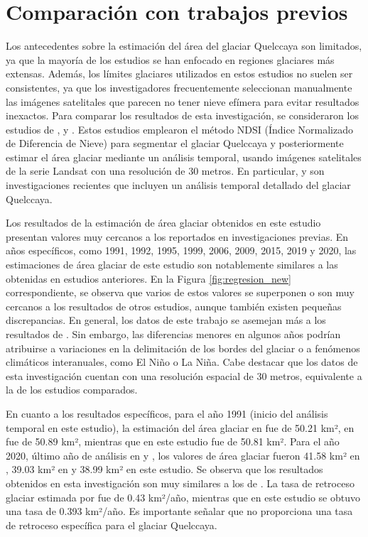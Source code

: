  \chapter{Comparación con trabajos previos}
\doublespacing
Los antecedentes sobre la estimación del área del glaciar Quelccaya son limitados, ya que la mayoría de los estudios se han enfocado en regiones glaciares más extensas. Además, los límites glaciares utilizados en estos estudios no suelen ser consistentes, ya que los investigadores frecuentemente seleccionan manualmente las imágenes satelitales que parecen no tener nieve efímera para evitar resultados inexactos. Para comparar los resultados de esta investigación, se consideraron los estudios de \parencite{malone2022evolution}, \parencite{taylor2022multi} y \parencite{hanshaw2014glacial}. Estos estudios emplearon el método NDSI (Índice Normalizado de Diferencia de Nieve) para segmentar el glaciar Quelccaya y posteriormente estimar el área glaciar mediante un análisis temporal, usando imágenes satelitales de la serie Landsat con una resolución de 30 metros. En particular, \parencite{malone2022evolution} y \parencite{taylor2022multi} son investigaciones recientes que incluyen un análisis temporal detallado del glaciar Quelccaya.

Los resultados de la estimación de área glaciar obtenidos en este estudio presentan valores muy cercanos a los reportados en investigaciones previas. En años específicos, como 1991, 1992, 1995, 1999, 2006, 2009, 2015, 2019 y 2020, las estimaciones de área glaciar de este estudio son notablemente similares a las obtenidas en estudios anteriores. En la Figura \ref{fig:regresion_new} correspondiente, se observa que varios de estos valores se superponen o son muy cercanos a los resultados de otros estudios, aunque también existen pequeñas discrepancias. En general, los datos de este trabajo se asemejan más a los resultados de \parencite{malone2022evolution}. Sin embargo, las diferencias menores en algunos años podrían atribuirse a variaciones en la delimitación de los bordes del glaciar o a fenómenos climáticos interanuales, como El Niño o La Niña. Cabe destacar que los datos de esta investigación cuentan con una resolución espacial de 30 metros, equivalente a la de los estudios comparados.

En cuanto a los resultados específicos, para el año 1991 (inicio del análisis temporal en este estudio), la estimación del área glaciar en \parencite{taylor2022multi} fue de 50.21 km², en \parencite{malone2022evolution} fue de 50.89 km², mientras que en este estudio fue de 50.81 km². Para el año 2020, último año de análisis en \parencite{taylor2022multi} y \parencite{malone2022evolution}, los valores de área glaciar fueron 41.58 km² en \parencite{taylor2022multi}, 39.03 km² en \parencite{malone2022evolution} y 38.99 km² en este estudio. Se observa que los resultados obtenidos en esta investigación son muy similares a los de \parencite{malone2022evolution}. La tasa de retroceso glaciar estimada por \parencite{malone2022evolution} fue de 0.43 km²/año, mientras que en este estudio se obtuvo una tasa de 0.393 km²/año. Es importante señalar que \parencite{taylor2022multi} no proporciona una tasa de retroceso específica para el glaciar Quelccaya.

